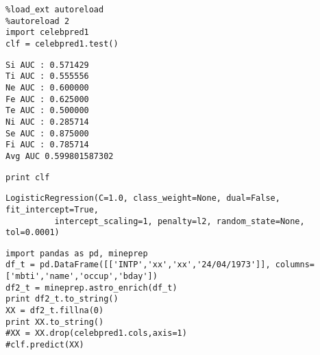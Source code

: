 \documentclass[12pt,fleqn]{article}\usepackage{../common}
\begin{document}
\begin{verbatim}
%load_ext autoreload
%autoreload 2
import celebpred1
clf = celebpred1.test()
\end{verbatim}

\begin{verbatim}
Si AUC : 0.571429
Ti AUC : 0.555556
Ne AUC : 0.600000
Fe AUC : 0.625000
Te AUC : 0.500000
Ni AUC : 0.285714
Se AUC : 0.875000
Fi AUC : 0.785714
Avg AUC 0.599801587302
\end{verbatim}

\begin{verbatim}
print clf
\end{verbatim}

\begin{verbatim}
LogisticRegression(C=1.0, class_weight=None, dual=False, fit_intercept=True,
          intercept_scaling=1, penalty=l2, random_state=None, tol=0.0001)
\end{verbatim}

\begin{verbatim}
import pandas as pd, mineprep
df_t = pd.DataFrame([['INTP','xx','xx','24/04/1973']], columns=['mbti','name','occup','bday'])
df2_t = mineprep.astro_enrich(df_t)
print df2_t.to_string()
XX = df2_t.fillna(0)
print XX.to_string()
#XX = XX.drop(celebpred1.cols,axis=1)
#clf.predict(XX)
\end{verbatim}
\end{document}
